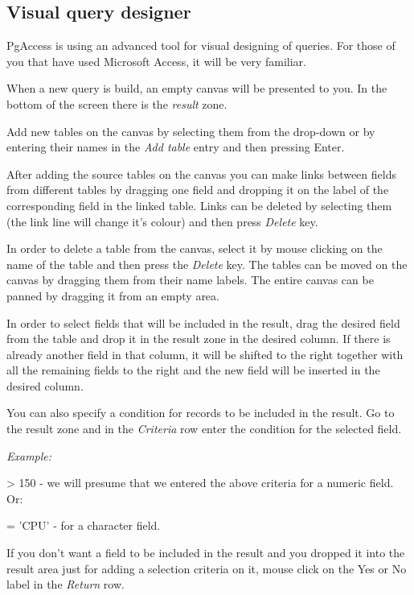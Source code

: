 \subsection{Visual query designer}
PgAccess is using an advanced tool for visual designing of queries. For those
of you that have used Microsoft Access, it will be very familiar.

When a new query is build, an empty canvas will be presented to you. In the
bottom of the screen there is the \emph{result} zone.

Add new tables on the canvas by selecting them from the drop-down or by entering
their names in the \emph{Add table} entry and then pressing Enter.

After adding the source tables on the canvas you can make links between fields
from different tables by dragging one field and dropping it on the label of the
corresponding field in the linked table. Links can be deleted by selecting them
(the link line will change it's colour) and then press \emph{Delete} key.

In order to delete a table from the canvas, select it by mouse clicking on the
name of the table and then press the \emph{Delete} key. The tables can be moved
on the canvas by dragging them from their name labels. The entire canvas can be
 panned by dragging it from an empty area.

In order to select fields that will be included in the result, drag the desired
field from the table and drop it in the result zone in the desired column.
If there is already another field in that column, it will be shifted to the
right together with all the remaining fields to the right and the new field will
be inserted in the desired column.

You can also specify a condition for records to be included in the result. Go
to the result zone and in the \emph{Criteria} row enter the condition for the
selected field.

\textit{Example:}
\begin{description}
    \item{> 150 - } we will presume that we entered the above criteria for a numeric field. Or:
    \item{= 'CPU' - } for a character field.
\end{description}

If you don't want a field to be included in the result and you dropped it into
the result area just for adding a selection criteria on it, mouse click on 
the Yes or No label in the \emph{Return} row.

